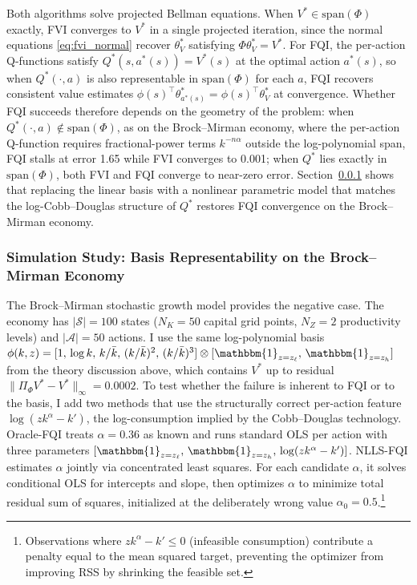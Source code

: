 Both algorithms solve projected Bellman equations. When $V^* \in \mathrm{span}(\Phi)$ exactly, FVI converges to $V^*$ in a single projected iteration, since the normal equations \eqref{eq:fvi_normal} recover $\theta_V^*$ satisfying $\Phi \theta_V^* = V^*$. For FQI, the per-action Q-functions satisfy $Q^*(s, a^*(s)) = V^*(s)$ at the optimal action $a^*(s)$, so when $Q^*(\cdot, a)$ is also representable in $\mathrm{span}(\Phi)$ for each $a$, FQI recovers consistent value estimates $\phi(s)^\top \theta_{a^*(s)}^* = \phi(s)^\top \theta_V^*$ at convergence. Whether FQI succeeds therefore depends on the geometry of the problem: when $Q^*(\cdot, a) \notin \mathrm{span}(\Phi)$, as on the Brock--Mirman economy, where the per-action Q-function requires fractional-power terms $k^{-n\alpha}$ outside the log-polynomial span, FQI stalls at error 1.65 while FVI converges to 0.001; when $Q^*$ lies exactly in $\mathrm{span}(\Phi)$, both FVI and FQI converge to near-zero error. Section~\ref{sec:bm_fvi_fqi} shows that replacing the linear basis with a nonlinear parametric model that matches the log-Cobb--Douglas structure of $Q^*$ restores FQI convergence on the Brock--Mirman economy.


\subsubsection{Simulation Study: Basis Representability on the Brock--Mirman Economy}
\label{sec:bm_fvi_fqi}

The Brock--Mirman stochastic growth model \citep{brockmirman1972} provides the negative case. The economy has $|\mathcal{S}| = 100$ states ($N_K = 50$ capital grid points, $N_Z = 2$ productivity levels) and $|\mathcal{A}| = 50$ actions. I use the same log-polynomial basis $\phi(k,z) = [1,\, \log k,\, k/\bar{k},\, (k/\bar{k})^2,\, (k/\bar{k})^3] \otimes [\mathbbm{1}_{z = z_\ell},\, \mathbbm{1}_{z = z_h}]$ from the theory discussion above, which contains $V^*$ up to residual $\|\Pi_\Phi V^* - V^*\|_\infty = 0.0002$. To test whether the failure is inherent to FQI or to the basis, I add two methods that use the structurally correct per-action feature $\log(z k^\alpha - k')$, the log-consumption implied by the Cobb--Douglas technology. Oracle-FQI treats $\alpha = 0.36$ as known and runs standard OLS per action with three parameters $[\mathbbm{1}_{z = z_\ell},\, \mathbbm{1}_{z = z_h},\, \log(z k^\alpha - k')]$. NLLS-FQI estimates $\alpha$ jointly via concentrated least squares. For each candidate $\alpha$, it solves conditional OLS for intercepts and slope, then optimizes $\alpha$ to minimize total residual sum of squares, initialized at the deliberately wrong value $\alpha_0 = 0.5$.\footnote{Observations where $z k^\alpha - k' \leq 0$ (infeasible consumption) contribute a penalty equal to the mean squared target, preventing the optimizer from improving RSS by shrinking the feasible set.}

